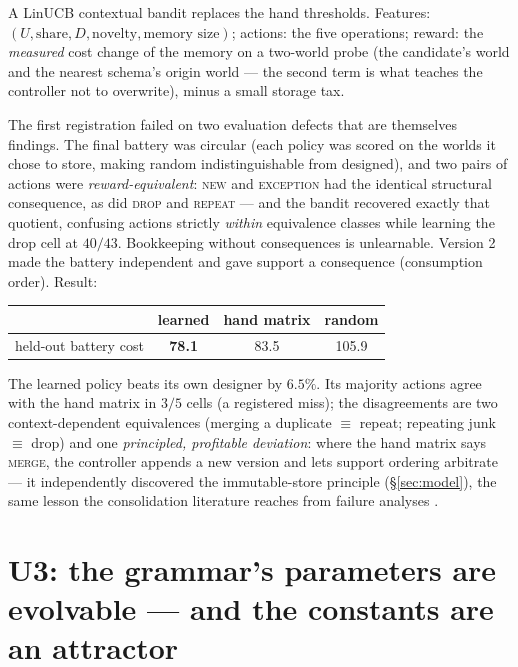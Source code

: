 \documentclass{article}
\begin{document}
A LinUCB contextual bandit replaces the hand thresholds. Features:
$(U, \text{share}, D, \text{novelty}, \text{memory size})$; actions:
the five operations; reward: the \emph{measured} cost change of the
memory on a two-world probe (the candidate's world and the nearest
schema's origin world --- the second term is what teaches the
controller not to overwrite), minus a small storage tax.

The first registration failed on two evaluation defects that are
themselves findings. The final battery was circular (each policy was
scored on the worlds it chose to store, making random indistinguishable
from designed), and two pairs of actions were
\emph{reward-equivalent}: \textsc{new} and \textsc{exception} had the
identical structural consequence, as did \textsc{drop} and
\textsc{repeat} --- and the bandit recovered exactly that quotient,
confusing actions strictly \emph{within} equivalence classes while
learning the drop cell at $40/43$. Bookkeeping without consequences
is unlearnable. Version 2 made the battery independent and gave
support a consequence (consumption order). Result:

\begin{center}
\small
\begin{tabular}{lccc}
\toprule
 & learned & hand matrix & random \\
\midrule
held-out battery cost & \textbf{78.1} & 83.5 & 105.9 \\
\bottomrule
\end{tabular}
\end{center}

The learned policy beats its own designer by $6.5\%$. Its majority
actions agree with the hand matrix in $3/5$ cells (a registered
miss); the disagreements are two context-dependent equivalences
(merging a duplicate $\equiv$ repeat; repeating junk $\equiv$ drop)
and one \emph{principled, profitable deviation}: where the hand
matrix says \textsc{merge}, the controller appends a new version and
lets support ordering arbitrate --- it independently discovered the
immutable-store principle (\S\ref{sec:model}), the same lesson the
consolidation literature reaches from failure analyses
\citep{trustmem2026,faulty2026}.

\section{U3: the grammar's parameters are evolvable --- and the
constants are an attractor}
\label{sec:u3}
\end{document}
